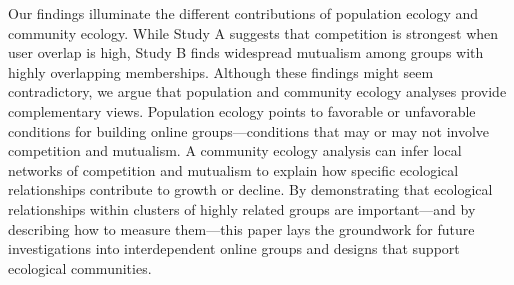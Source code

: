 \documentclass[letterpaper]{article}\usepackage[]{graphicx}\usepackage[]{color}
\begin{document}

Our findings illuminate the different contributions of population ecology and community ecology.
While Study A suggests that competition is strongest when user overlap is high, Study B finds widespread mutualism among groups with highly overlapping memberships.
Although these findings might seem contradictory, we argue that population and community ecology analyses provide complementary views. Population ecology points to favorable or unfavorable conditions for building online groups---conditions that may or may not involve competition and mutualism.  A community ecology analysis can infer local networks of competition and mutualism to explain how specific ecological relationships contribute to growth or decline. By demonstrating that ecological relationships within clusters of highly related groups are important---and by describing how to measure them---this paper lays the groundwork for future investigations into interdependent online groups and designs that support ecological communities. 
















\end{document}
